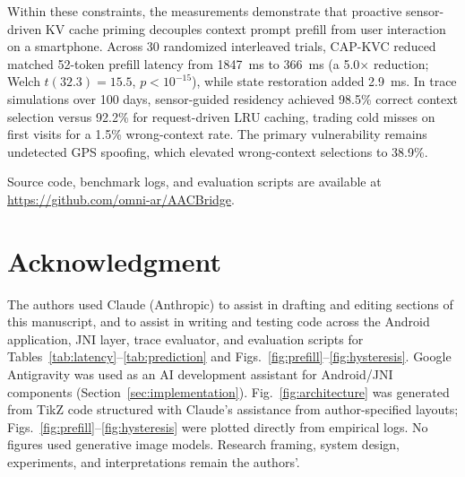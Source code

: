 \documentclass[conference]{IEEEtran}
\begin{document}
Within these constraints, the measurements demonstrate that proactive sensor-driven KV cache priming decouples context prompt prefill from user interaction on a smartphone. Across 30 randomized interleaved trials, CAP-KVC reduced matched 52-token prefill latency from 1847~ms to 366~ms (a 5.0$\times$ reduction; Welch $t(32.3)=15.5$, $p<10^{-15}$), while state restoration added 2.9~ms. In trace simulations over 100 days, sensor-guided residency achieved 98.5\% correct context selection versus 92.2\% for request-driven LRU caching, trading cold misses on first visits for a 1.5\% wrong-context rate. The primary vulnerability remains undetected GPS spoofing, which elevated wrong-context selections to 38.9\%.

Source code, benchmark logs, and evaluation scripts are available at \url{https://github.com/omni-ar/AACBridge}.

\section*{Acknowledgment}
The authors used Claude (Anthropic) to assist in drafting and editing sections of this manuscript, and to assist in writing and testing code across the Android application, JNI layer, trace evaluator, and evaluation scripts for Tables~\ref{tab:latency}--\ref{tab:prediction} and Figs.~\ref{fig:prefill}--\ref{fig:hysteresis}. Google Antigravity was used as an AI development assistant for Android/JNI components (Section~\ref{sec:implementation}). Fig.~\ref{fig:architecture} was generated from TikZ code structured with Claude's assistance from author-specified layouts; Figs.~\ref{fig:prefill}--\ref{fig:hysteresis} were plotted directly from empirical logs. No figures used generative image models. Research framing, system design, experiments, and interpretations remain the authors'.
\end{document}
